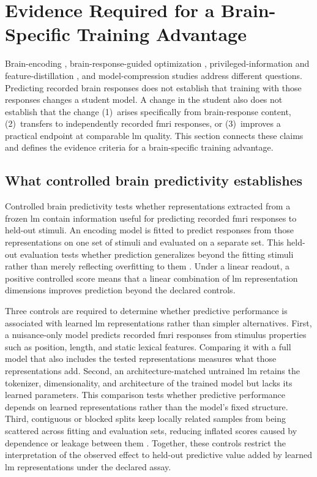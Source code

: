 \section{Evidence Required for a Brain-Specific Training Advantage}
\label{sec:valid-claim}

Brain-encoding \autocite{oota2023,merlin2024}, brain-response-guided optimization \autocite{moussa2025,negi2025,merlinData2026,vaidya2026}, privileged-information and feature-distillation \autocite{lopezpaz2016,saadi2025}, and model-compression \autocite{oota2026} studies address different questions.
Predicting recorded brain responses does not establish that training with those responses changes a student model.
A change in the student also does not establish that the change (1)\ arises specifically from brain-response content, (2)\ transfers to independently recorded \ac{fmri} responses, or (3)\ improves a practical endpoint at comparable \ac{lm} quality.
This section connects these claims and defines the evidence criteria for a brain-specific training advantage.

\subsection{What controlled brain predictivity establishes}
\label{sec:controlled-score}

Controlled brain predictivity tests whether representations extracted from a frozen \ac{lm} contain information useful for predicting recorded \ac{fmri} responses to held-out stimuli.
An encoding model is fitted to predict responses from those representations on one set of stimuli and evaluated on a separate set.
This held-out evaluation tests whether prediction generalizes beyond the fitting stimuli rather than merely reflecting overfitting to them \autocite{oota2023,merlin2024}.
Under a linear readout, a positive controlled score means that a linear combination of \ac{lm} representation dimensions improves prediction beyond the declared controls.

Three controls are required to determine whether predictive performance is associated with learned \ac{lm} representations rather than simpler alternatives.
First, a nuisance-only model predicts recorded \ac{fmri} responses from stimulus properties such as position, length, and static lexical features.
Comparing it with a full model that also includes the tested representations measures what those representations add.
Second, an architecture-matched untrained \ac{lm} retains the tokenizer, dimensionality, and architecture of the trained model but lacks its learned parameters.
This comparison tests whether predictive performance depends on learned representations rather than the model's fixed structure.
Third, contiguous or blocked splits keep locally related samples from being scattered across fitting and evaluation sets, reducing inflated scores caused by dependence or leakage between them \autocite{hadidi2026}.
Together, these controls restrict the interpretation of the observed effect to held-out predictive value added by learned \ac{lm} representations under the declared assay.

